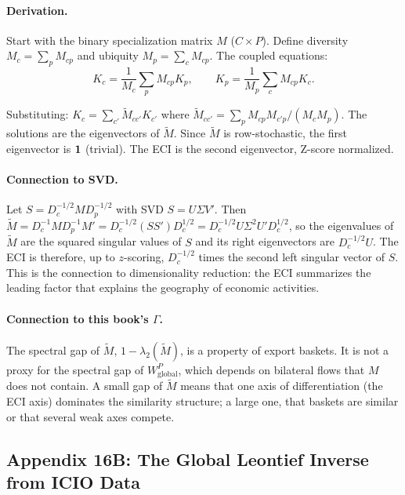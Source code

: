 \documentclass[../structural_economics_book.tex]{subfiles}
\begin{document}
\paragraph{Derivation.} Start with the binary specialization matrix $M$ ($C \times P$). Define diversity $M_c = \sum_p M_{cp}$ and ubiquity $M_p = \sum_c M_{cp}$. The coupled equations:
\begin{equation}
K_c = \frac{1}{M_c}\sum_p M_{cp}K_p, \qquad K_p = \frac{1}{M_p}\sum_c M_{cp}K_c.
\end{equation}

Substituting: $K_c = \sum_{c'} \tilde{M}_{cc'} K_{c'}$ where $\tilde{M}_{cc'} = \sum_p M_{cp}M_{c'p}/(M_cM_p)$. The solutions are the eigenvectors of $\tilde{M}$. Since $\tilde{M}$ is row-stochastic, the first eigenvector is $\mathbf{1}$ (trivial). The ECI is the second eigenvector, Z-score normalized.

\paragraph{Connection to SVD.} Let $S = D_c^{-1/2}MD_p^{-1/2}$ with SVD $S = U\Sigma V'$. Then $\tilde{M} = D_c^{-1}MD_p^{-1}M' = D_c^{-1/2}(SS')D_c^{1/2} = D_c^{-1/2}U\Sigma^2U'D_c^{1/2}$, so the eigenvalues of $\tilde{M}$ are the squared singular values of $S$ and its right eigenvectors are $D_c^{-1/2}U$. The ECI is therefore, up to $z$-scoring, $D_c^{-1/2}$ times the second left singular vector of $S$. This is the connection to dimensionality reduction: the ECI summarizes the leading factor that explains the geography of economic activities.

\paragraph{Connection to this book's $\Gamma$.} The spectral gap of $\tilde{M}$, $1 - \lambda_2(\tilde{M})$, is a property of export baskets. It is not a proxy for the spectral gap of $W^P_{\text{global}}$, which depends on bilateral flows that $M$ does not contain. A small gap of $\tilde{M}$ means that one axis of differentiation (the ECI axis) dominates the similarity structure; a large one, that baskets are similar or that several weak axes compete.


\subsection*{Appendix 16B: The Global Leontief Inverse from ICIO Data}
\label{ch16:app:leontief}
\end{document}
